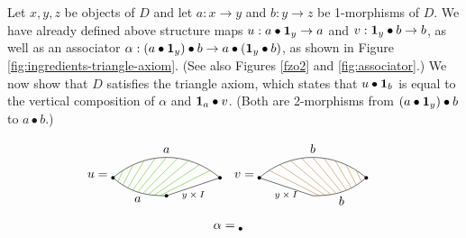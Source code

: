Let $x,y,z$ be objects of $D$ and let $a:x\to y$ and $b:y\to z$ be 1-morphisms of $D$.
We have already defined above 
structure maps $u:a\bullet \boldsymbol{1}_y\to a$ and $v:\boldsymbol{1}_y\bullet b\to b$, as well as an associator
$\alpha: (a\bullet \boldsymbol{1}_y)\bullet b\to a\bullet(\boldsymbol{1}_y\bullet b)$, as shown in
Figure \ref{fig:ingredients-triangle-axiom}.
(See also Figures \ref{fzo2} and \ref{fig:associator}.)
We now show that $D$ satisfies the triangle axiom, which states that $u\bullet\boldsymbol{1}_b$ 
is equal to the vertical composition of $\alpha$ and $\boldsymbol{1}_a\bullet v$.
(Both are 2-morphisms from $(a\bullet \boldsymbol{1}_y)\bullet b$ to $a\bullet b$.)
\begin{figure}[t]
\begin{align*}
u & =
\begin{tikzpicture}[baseline]
\coordinate (P) at (0,0);
\coordinate (Q) at (3,0);
\coordinate (R) at (1.5,-0.5);
\draw (P) \vertex to[out=40,in=140] node[above] {$a$} (Q) \vertex -- node[below] {\scriptsize $y \times I$} (R) \vertex to[out=-180,in=-40] node[below] {$a$} (P);
\clip (P) to[out=40,in=140] (Q) -- (R) to[out=-180,in=-40] (P);
\foreach \x in {1,...,9} {
	\path (P) to[out=40,in=140] node[pos=\x/10] (PQ\x) {} (Q);
	\path (P) to[out=-40,in=-180] node[pos=\x/10] (PR\x) {} (R);
	\draw[green!50!brown] (PQ\x.center) -- (PR\x.center);
}
\end{tikzpicture} &
v & = 
\begin{tikzpicture}[baseline]
\coordinate (P) at (0,0);
\coordinate (Q) at (3,0);
\coordinate (R) at (1.5,-0.5);
\draw (P) \vertex to[out=40,in=140] node[above] {$b$} (Q) \vertex to[out=-140,in=0] node[below] {$b$} (R) -- node[below] {\scriptsize $y \times I$}  (P);
\clip (P) to[out=40,in=140] (Q) to[out=-140,in=0] (R) -- (P);
\foreach \x in {1,...,9} {
	\path (P) to[out=40,in=140] node[pos=\x/10] (PQ\x) {} (Q);
	\path (R) to[out=0,in=-140] node[pos=\x/10] (RQ\x) {} (Q);
	\draw[brown] (PQ\x.center) -- (RQ\x.center);
}
\end{tikzpicture}
\end{align*}
\vspace{-2cm}
\begin{align*}
\alpha & = 
\begin{tikzpicture}[baseline]
\node[circle,fill=black,inner sep=1pt] at (1.73,0) {};

\end{tikzpicture}
\end{align*}
\end{figure}
